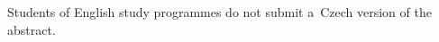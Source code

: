 \documentclass[12pt]{report}
\begin{document}
\ifx\StudyLanguage\LangCS

\AbstractCS

\else

Students of English study programmes do not submit a~Czech version
of the abstract.

\fi
\end{document}

